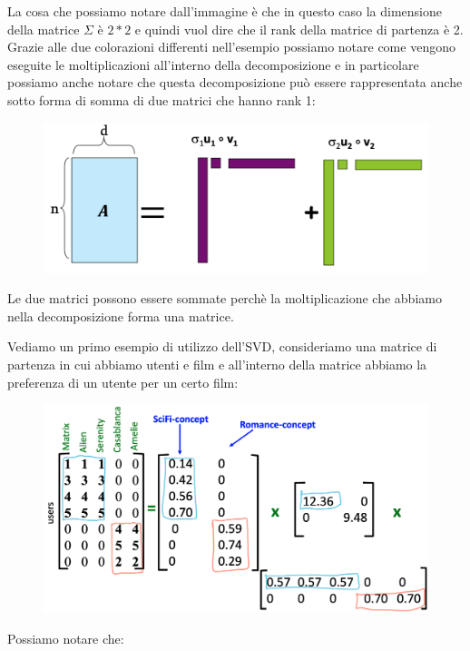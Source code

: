 \documentclass[14pt]{extreport}
\begin{document}
La cosa che possiamo notare dall'immagine è che in questo caso la dimensione della matrice $\Sigma$ è $2*2$ e quindi vuol dire che il rank della matrice di partenza è 2.
Grazie alle due colorazioni differenti nell'esempio possiamo notare come vengono eseguite le moltiplicazioni all'interno della decomposizione e in particolare possiamo anche 
notare che questa decomposizione può essere rappresentata anche sotto forma di somma di due matrici che hanno rank 1:


\begin{figure}[H] 
\centering
\includegraphics[width=0.7\linewidth]{497.jpeg}
\end{figure}

Le due matrici possono essere sommate perchè la moltiplicazione che abbiamo nella decomposizione forma una matrice.

Vediamo un primo esempio di utilizzo dell'SVD, consideriamo una matrice di partenza in cui abbiamo utenti e film e all'interno della matrice abbiamo la preferenza
di un utente per un certo film:

\begin{figure}[H] 
\centering
\includegraphics[width=0.7\linewidth]{498.jpeg}
\end{figure}

Possiamo notare che:
\end{document}

